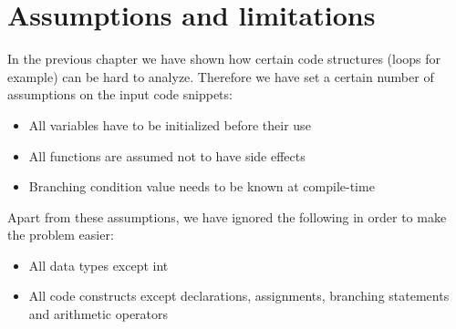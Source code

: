 \section{Assumptions and limitations}
\label{sec:AssumptionsAndLimitations}

In the previous chapter we have shown how certain code structures (loops for example) can be hard to analyze. Therefore we have set a certain number of assumptions on the input code snippets:

\begin{itemize}
    \item All variables have to be initialized before their use
    \item All functions are assumed not to have side effects
    \item Branching condition value needs to be known at compile-time
\end{itemize}

Apart from these assumptions, we have ignored the following in order to make the problem easier:

\begin{itemize}
    \item All data types except int
    \item All code constructs except declarations, assignments, branching statements and arithmetic operators
\end{itemize}
